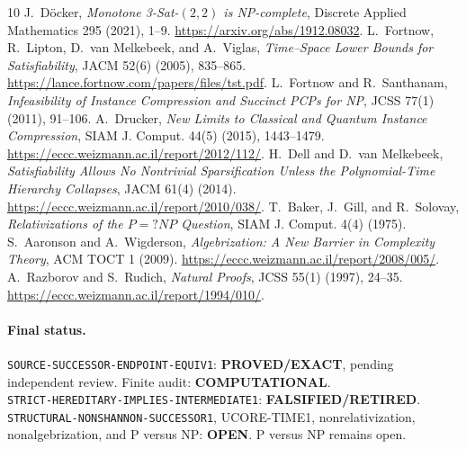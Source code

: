 \documentclass[11pt]{article}
\newcommand{\EXACT}{\textbf{PROVED/EXACT}}
\newcommand{\OPEN}{\textbf{OPEN}}
\newcommand{\RETIRED}{\textbf{FALSIFIED/RETIRED}}
\newcommand{\COMP}{\textbf{COMPUTATIONAL}}
\begin{document}
\begin{thebibliography}{10}
 J.~D\"ocker,
\emph{Monotone 3-Sat-$(2,2)$ is NP-complete},
Discrete Applied Mathematics 295 (2021), 1--9.
\url{https://arxiv.org/abs/1912.08032}.
 L.~Fortnow, R.~Lipton, D.~van Melkebeek, and A.~Viglas,
\emph{Time--Space Lower Bounds for Satisfiability}, JACM 52(6) (2005),
835--865. \url{https://lance.fortnow.com/papers/files/tst.pdf}.
 L.~Fortnow and R.~Santhanam,
\emph{Infeasibility of Instance Compression and Succinct PCPs for NP},
JCSS 77(1) (2011), 91--106.
 A.~Drucker,
\emph{New Limits to Classical and Quantum Instance Compression},
SIAM J. Comput. 44(5) (2015), 1443--1479.
\url{https://eccc.weizmann.ac.il/report/2012/112/}.
 H.~Dell and D.~van Melkebeek,
\emph{Satisfiability Allows No Nontrivial Sparsification Unless the
Polynomial-Time Hierarchy Collapses}, JACM 61(4) (2014).
\url{https://eccc.weizmann.ac.il/report/2010/038/}.
 T.~Baker, J.~Gill, and R.~Solovay,
\emph{Relativizations of the $P=?NP$ Question}, SIAM J. Comput. 4(4) (1975).
 S.~Aaronson and A.~Wigderson,
\emph{Algebrization: A New Barrier in Complexity Theory}, ACM TOCT 1 (2009).
\url{https://eccc.weizmann.ac.il/report/2008/005/}.
 A.~Razborov and S.~Rudich,
\emph{Natural Proofs}, JCSS 55(1) (1997), 24--35.
\url{https://eccc.weizmann.ac.il/report/1994/010/}.
\end{thebibliography}

\paragraph{Final status.}
\texttt{SOURCE-SUCCESSOR-ENDPOINT-EQUIV1}: \EXACT, pending independent
review.  Finite audit: \COMP.\\
\texttt{STRICT-HEREDITARY-IMPLIES-INTERMEDIATE1}: \RETIRED.\\
\texttt{STRUCTURAL-NONSHANNON-SUCCESSOR1}, UCORE-TIME1,
nonrelativization, nonalgebrization, and P versus NP: \OPEN.
P versus NP remains open.

\end{document}
